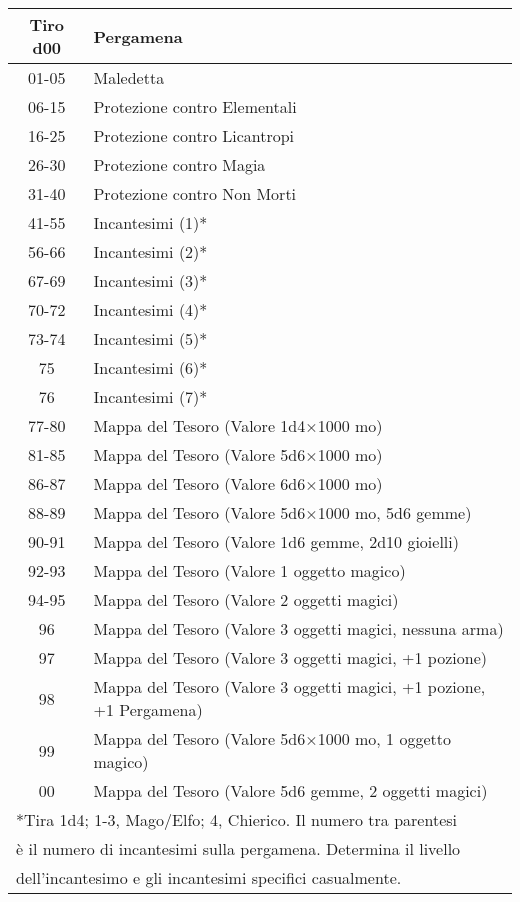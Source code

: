 \documentclass{article}
\begin{document}
\begin{multicols}{2}
\begin{tabular}{|c|l|}
\hline
\textbf{Tiro d00} & \textbf{Pergamena} \\
\hline
01-05 & Maledetta \\
06-15 & Protezione contro Elementali \\
16-25 & Protezione contro Licantropi \\
26-30 & Protezione contro Magia \\
31-40 & Protezione contro Non Morti \\
41-55 & Incantesimi (1)* \\
56-66 & Incantesimi (2)* \\
67-69 & Incantesimi (3)* \\
70-72 & Incantesimi (4)* \\
73-74 & Incantesimi (5)* \\
75 & Incantesimi (6)* \\
76 & Incantesimi (7)* \\
77-80 & Mappa del Tesoro (Valore 1d4×1000 mo) \\
81-85 & Mappa del Tesoro (Valore 5d6×1000 mo) \\
86-87 & Mappa del Tesoro (Valore 6d6×1000 mo) \\
88-89 & Mappa del Tesoro (Valore 5d6×1000 mo, 5d6 gemme) \\
90-91 & Mappa del Tesoro (Valore 1d6 gemme, 2d10 gioielli) \\
92-93 & Mappa del Tesoro (Valore 1 oggetto magico) \\
94-95 & Mappa del Tesoro (Valore 2 oggetti magici) \\
96 & Mappa del Tesoro (Valore 3 oggetti magici, nessuna arma) \\
97 & Mappa del Tesoro (Valore 3 oggetti magici, +1 pozione) \\
98 & Mappa del Tesoro (Valore 3 oggetti magici, +1 pozione, +1 Pergamena) \\
99 & Mappa del Tesoro (Valore 5d6×1000 mo, 1 oggetto magico) \\
00 & Mappa del Tesoro (Valore 5d6 gemme, 2 oggetti magici) \\
\hline
\multicolumn{2}{l}{*Tira 1d4; 1-3, Mago/Elfo; 4, Chierico. Il numero tra parentesi} \\
\multicolumn{2}{l}{è il numero di incantesimi sulla pergamena. Determina il livello} \\
\multicolumn{2}{l}{dell'incantesimo e gli incantesimi specifici casualmente.} \\
\end{tabular}


\end{multicols}
\end{document}
